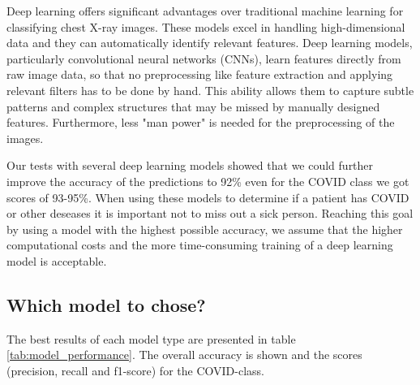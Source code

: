 \documentclass{article}
\begin{document}
Deep learning offers significant advantages over traditional machine learning for classifying chest X-ray images. These models excel in handling high-dimensional data and they can automatically identify relevant features. Deep learning models, particularly convolutional neural networks (CNNs), learn features directly from raw image data, so that no preprocessing like feature extraction and applying relevant filters has to be done by hand. This ability allows them to capture subtle patterns and complex structures that may be missed by manually designed features. Furthermore, less "man power" is needed for the preprocessing of the images. 

Our tests with several deep learning models showed that we could further improve the accuracy of the predictions to 92\% even for the COVID class we got scores of 93-95\%. When using these models to determine if a patient has COVID or other deseases it is important not to miss out a sick person. Reaching this goal by using a model with the highest possible accuracy, we assume that the higher computational costs and the more time-consuming training of a deep learning model is acceptable.\\


\subsection{Which model to chose?}
The best results of each model type are presented in table \ref{tab:model_performance}. The overall accuracy is shown and the scores (precision, recall and f1-score) for the COVID-class. 
\end{document}
